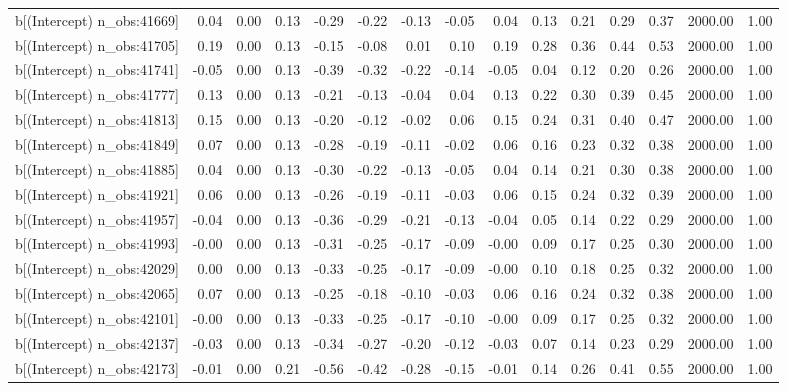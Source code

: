 \begin{table}[ht]
\begin{tabular}{rrrrrrrrrrrrrrr}
  b[(Intercept) n\_obs:41669] & 0.04 & 0.00 & 0.13 & -0.29 & -0.22 & -0.13 & -0.05 & 0.04 & 0.13 & 0.21 & 0.29 & 0.37 & 2000.00 & 1.00 \\ 
  b[(Intercept) n\_obs:41705] & 0.19 & 0.00 & 0.13 & -0.15 & -0.08 & 0.01 & 0.10 & 0.19 & 0.28 & 0.36 & 0.44 & 0.53 & 2000.00 & 1.00 \\ 
  b[(Intercept) n\_obs:41741] & -0.05 & 0.00 & 0.13 & -0.39 & -0.32 & -0.22 & -0.14 & -0.05 & 0.04 & 0.12 & 0.20 & 0.26 & 2000.00 & 1.00 \\ 
  b[(Intercept) n\_obs:41777] & 0.13 & 0.00 & 0.13 & -0.21 & -0.13 & -0.04 & 0.04 & 0.13 & 0.22 & 0.30 & 0.39 & 0.45 & 2000.00 & 1.00 \\ 
  b[(Intercept) n\_obs:41813] & 0.15 & 0.00 & 0.13 & -0.20 & -0.12 & -0.02 & 0.06 & 0.15 & 0.24 & 0.31 & 0.40 & 0.47 & 2000.00 & 1.00 \\ 
  b[(Intercept) n\_obs:41849] & 0.07 & 0.00 & 0.13 & -0.28 & -0.19 & -0.11 & -0.02 & 0.06 & 0.16 & 0.23 & 0.32 & 0.38 & 2000.00 & 1.00 \\ 
  b[(Intercept) n\_obs:41885] & 0.04 & 0.00 & 0.13 & -0.30 & -0.22 & -0.13 & -0.05 & 0.04 & 0.14 & 0.21 & 0.30 & 0.38 & 2000.00 & 1.00 \\ 
  b[(Intercept) n\_obs:41921] & 0.06 & 0.00 & 0.13 & -0.26 & -0.19 & -0.11 & -0.03 & 0.06 & 0.15 & 0.24 & 0.32 & 0.39 & 2000.00 & 1.00 \\ 
  b[(Intercept) n\_obs:41957] & -0.04 & 0.00 & 0.13 & -0.36 & -0.29 & -0.21 & -0.13 & -0.04 & 0.05 & 0.14 & 0.22 & 0.29 & 2000.00 & 1.00 \\ 
  b[(Intercept) n\_obs:41993] & -0.00 & 0.00 & 0.13 & -0.31 & -0.25 & -0.17 & -0.09 & -0.00 & 0.09 & 0.17 & 0.25 & 0.30 & 2000.00 & 1.00 \\ 
  b[(Intercept) n\_obs:42029] & 0.00 & 0.00 & 0.13 & -0.33 & -0.25 & -0.17 & -0.09 & -0.00 & 0.10 & 0.18 & 0.25 & 0.32 & 2000.00 & 1.00 \\ 
  b[(Intercept) n\_obs:42065] & 0.07 & 0.00 & 0.13 & -0.25 & -0.18 & -0.10 & -0.03 & 0.06 & 0.16 & 0.24 & 0.32 & 0.38 & 2000.00 & 1.00 \\ 
  b[(Intercept) n\_obs:42101] & -0.00 & 0.00 & 0.13 & -0.33 & -0.25 & -0.17 & -0.10 & -0.00 & 0.09 & 0.17 & 0.25 & 0.32 & 2000.00 & 1.00 \\ 
  b[(Intercept) n\_obs:42137] & -0.03 & 0.00 & 0.13 & -0.34 & -0.27 & -0.20 & -0.12 & -0.03 & 0.07 & 0.14 & 0.23 & 0.29 & 2000.00 & 1.00 \\ 
  b[(Intercept) n\_obs:42173] & -0.01 & 0.00 & 0.21 & -0.56 & -0.42 & -0.28 & -0.15 & -0.01 & 0.14 & 0.26 & 0.41 & 0.55 & 2000.00 & 1.00 \\ 

\end{tabular}
\end{table}
